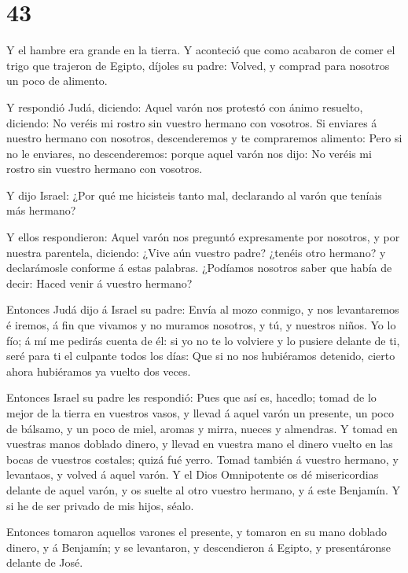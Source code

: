\hypertarget{section-42}{%
\section{43}\label{section-42}}

 Y el hambre era grande en la tierra.  Y
aconteció que como acabaron de comer el trigo que trajeron de Egipto,
díjoles su padre: Volved, y comprad para nosotros un poco de alimento.

 Y respondió Judá, diciendo: Aquel varón nos protestó con
ánimo resuelto, diciendo: No veréis mi rostro sin vuestro hermano con
vosotros.  Si enviares á nuestro hermano con nosotros,
descenderemos y te compraremos alimento:  Pero si no le
enviares, no descenderemos: porque aquel varón nos dijo: No veréis mi
rostro sin vuestro hermano con vosotros.

 Y dijo Israel: ¿Por qué me hicisteis tanto mal, declarando
al varón que teníais más hermano?

 Y ellos respondieron: Aquel varón nos preguntó expresamente
por nosotros, y por nuestra parentela, diciendo: ¿Vive aún vuestro
padre? ¿tenéis otro hermano? y declarámosle conforme á estas palabras.
¿Podíamos nosotros saber que había de decir: Haced venir á vuestro
hermano?

 Entonces Judá dijo á Israel su padre: Envía al mozo
conmigo, y nos levantaremos é iremos, á fin que vivamos y no muramos
nosotros, y tú, y nuestros niños.  Yo lo fío; á mí me
pedirás cuenta de él: si yo no te lo volviere y lo pusiere delante de
ti, seré para ti el culpante todos los días:  Que si no nos
hubiéramos detenido, cierto ahora hubiéramos ya vuelto dos veces.

 Entonces Israel su padre les respondió: Pues que así es,
hacedlo; tomad de lo mejor de la tierra en vuestros vasos, y llevad á
aquel varón un presente, un poco de bálsamo, y un poco de miel, aromas y
mirra, nueces y almendras.  Y tomad en vuestras manos
doblado dinero, y llevad en vuestra mano el dinero vuelto en las bocas
de vuestros costales; quizá fué yerro.  Tomad también á
vuestro hermano, y levantaos, y volved á aquel varón.  Y el
Dios Omnipotente os dé misericordias delante de aquel varón, y os suelte
al otro vuestro hermano, y á este Benjamín. Y si he de ser privado de
mis hijos, séalo.

 Entonces tomaron aquellos varones el presente, y tomaron
en su mano doblado dinero, y á Benjamín; y se levantaron, y descendieron
á Egipto, y presentáronse delante de José.

